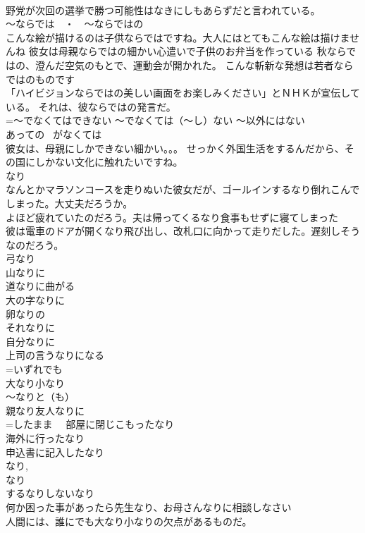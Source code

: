 \documentclass[8pt]{extreport}
\begin{document}
\begin{CJK}{UTF8}{min}
\\	野党が次回の選挙で勝つ可能性はなきにしもあらずだと言われている。 
\\	～ならでは　・　～ならではの	
\\	こんな絵が描けるのは子供ならではですね。大人にはとてもこんな絵は描けませんね 彼女は母親ならではの細かい心遣いで子供のお弁当を作っている 秋ならではの、澄んだ空気のもとで、運動会が開かれた。 こんな斬新な発想は若者ならではのものです 
\\	「ハイビジョンならではの美しい画面をお楽しみください」とＮＨＫが宣伝している。 それは、彼ならではの発言だ。 
\\	=～でなくてはできない ～でなくては（～し）ない ～以外にはない 
\\	あっての ~がなくては 
\\	彼女は、母親にしかできない細かい。。。 せっかく外国生活をするんだから、その国にしかない文化に触れたいですね。
\\	なり　
\\	なんとかマラソンコースを走りぬいた彼女だが、ゴールインするなり倒れこんでしまった。大丈夫だろうか。 
\\	よほど疲れていたのだろう。夫は帰ってくるなり食事もせずに寝てしまった 
\\	彼は電車のドアが開くなり飛び出し、改札口に向かって走りだした。遅刻しそうなのだろう。 
\\	弓なり　
\\	山なりに 
\\	道なりに曲がる 
\\	大の字なりに 
\\	卵なりの 
\\	それなりに 
\\	自分なりに 
\\	上司の言うなりになる 
\\	=いずれでも 
\\	大なり小なり 
\\	～なりと（も） 
\\	親なり友人なりに 
\\	=したまま 　部屋に閉じこもったなり 
\\	海外に行ったなり 
\\	申込書に記入したなり 
\\	なり, 
\\	なり 
\\	するなりしないなり 
\\	何か困った事があったら先生なり、お母さんなりに相談しなさい 
\\	人間には、誰にでも大なり小なりの欠点があるものだ。 

\end{CJK}
\end{document}
